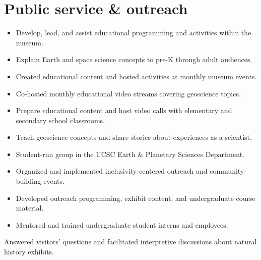 \section{Public service \& outreach}

\begin{itemize}
\item Develop, lead, and assist educational programming and activities within the museum.
\item Explain Earth and space science concepts to pre-K through adult audiences.
\end{itemize}

\begin{itemize}
	\item Created educational content and hosted activities at monthly museum events.
	\item Co-hosted monthly educational video streams covering geoscience topics.
\end{itemize}

\begin{itemize}
	\item Prepare educational content and host video calls with elementary and secondary school classrooms.
	\item Teach geoscience concepts and share stories about experiences as a scientist.
\end{itemize}

\begin{itemize}
	\item Student-run group in the UCSC Earth \& Planetary Sciences Department.
	\item Organized and implemented inclusivity-centered outreach and community-building events.
\end{itemize}

\begin{itemize}
	\item Developed outreach programming, exhibit content, and undergraduate course material.
	\item Mentored and trained undergraduate student interns and employees.
\end{itemize}


Answered visitors' questions and facilitated interpretive discussions about natural history exhibits.
